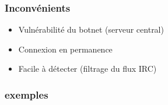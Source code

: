 \subsubsection{Inconvénients}
\begin{itemize}
	\item Vulnérabilité du botnet (serveur central)
	\item Connexion en permanence
	\item Facile à détecter (filtrage du flux IRC)
\end{itemize}


\subsubsection{exemples}
\noindent
{}
\noindent
{}